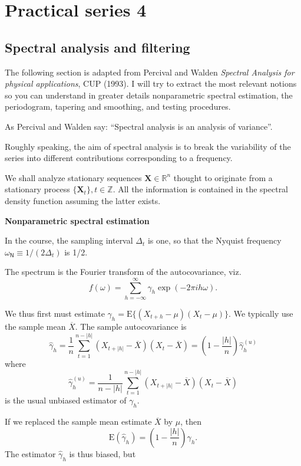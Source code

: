 \documentclass[]{book}
\begin{document}
\chapter{Practical series 4}\label{practical-series-4}

\section{Spectral analysis and
filtering}\label{spectral-analysis-and-filtering}

The following section is adapted from Percival and Walden \emph{Spectral
Analysis for physical applications}, CUP (1993). I will try to extract
the most relevant notions so you can understand in greater details
nonparametric spectral estimation, the periodogram, tapering and
smoothing, and testing procedures.

As Percival and Walden say: ``Spectral analysis is an analysis of
variance''.

Roughly speaking, the aim of spectral analysis is to break the
variability of the series into different contributions corresponding to
a frequency.

We shall analyze stationary sequences
\(\boldsymbol{X} \in \mathbb{R}^n\) thought to originate from a
stationary process \(\{\boldsymbol{X}_t\}, t \in \mathbb{Z}\). All the
information is contained in the spectral density function assuming the
latter exists.

\textbf{Nonparametric spectral estimation}

In the course, the sampling interval \(\Delta_t\) is one, so that the
Nyquist frequency \(\omega_\mathsf{N}\equiv 1/(2\Delta_t)\) is 1/2.

The spectrum is the Fourier transform of the autocovariance, viz.
\[f(\omega) = \sum_{h =-\infty}^\infty \gamma_h \exp(-2 \pi i  h \omega).\]

We thus first must estimate
\(\gamma_h=\mathrm{E}\{(X_{t+h}-\mu)(X_t-\mu)\}\). We typically use the
sample mean \(\overline{X}\). The sample autocovariance is
\[\widehat{\gamma}_h = \frac{1}{n} \sum_{t=1}^{n-|h|} (X_{t+|h|}-\overline{X})(X_t-\overline{X}) = \left( 1- \frac{|h|}{n}\right)\widehat{\gamma}_h^{(u)}\]
where
\[\widehat{\gamma}_h^{(u)} = \frac{1}{n-|h|} \sum_{t=1}^{n-|h|} (X_{t+|h|}-\overline{X})(X_t-\overline{X})\]
is the usual unbiased estimator of \(\gamma_h\).

If we replaced the sample mean estimate \(\overline{X}\) by \(\mu\),
then
\[\mathrm{E}(\widehat{\gamma}_h) = \left(1- \frac{|h|}{n}\right)\gamma_h.\]
The estimator \(\widehat{\gamma}_h\) is thus biased, but
\end{document}
